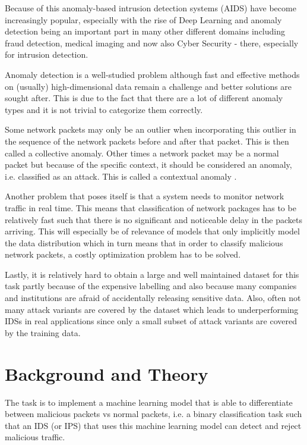 \documentclass[]{article}
\begin{document}
	Because of this anomaly-based intrusion detection systems (AIDS) have become increasingly popular, especially with the rise of Deep Learning and anomaly detection being an important part in many other different domains including fraud detection, medical imaging and now also Cyber Security - there, especially for intrusion detection. 
	\newline
	
	\noindent
	Anomaly detection is a well-studied problem although fast and effective methods on (usually) high-dimensional data remain a challenge and better solutions are sought after.  This is due to the fact that there are a lot of different anomaly types and it is not trivial to categorize them correctly. 
	
	Some network packets may only be an outlier when incorporating this outlier in the sequence of the network packets before and after that packet. This is then called a collective anomaly. Other times a network packet may be a normal packet but because of the specific context, it should be considered an anomaly, i.e. classified as an attack. This is called a contextual anomaly \cite{10.1145/1541880.1541882}. 
	\newline
	
	\noindent
	Another problem that poses itself is that a system needs to monitor network traffic in real time. This means that classification of network packages has to be relatively fast such that there is no significant and noticeable delay in the packets arriving. This will especially be of relevance of models that only implicitly model the data distribution which in turn means that in order to classify malicious network packets, a costly optimization problem has to be solved.
	\newline
	
	\noindent
	Lastly, it is relatively hard to obtain a large and well maintained dataset for this task partly because of the expensive labelling and also because many companies and institutions are afraid of accidentally releasing sensitive data. Also, often not many attack variants are covered by the dataset which leads to underperforming IDSs in real applications since only a small subset of attack variants are covered by the training data. 
	
	
	\section{Background and Theory}

	
	 The task is to implement a machine learning model that is able to differentiate between malicious packets vs normal packets, i.e. a binary classification task such that an IDS (or IPS) that uses this machine learning model can detect and reject malicious traffic. 
	 
\end{document}
